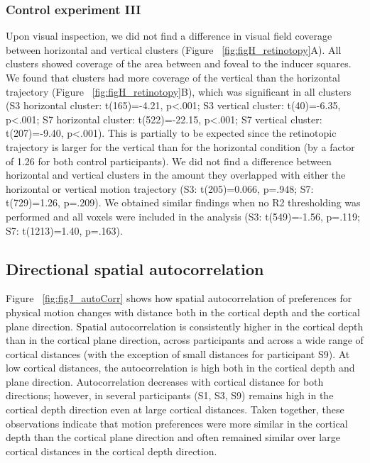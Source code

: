 \subsubsection{Control experiment III}
Upon visual inspection, we did not find a difference in visual field coverage between horizontal and vertical clusters (Figure ~\ref{fig:figH_retinotopy}A). All clusters showed coverage of the area between and foveal to the inducer squares. We found that clusters had more coverage of the vertical than the horizontal trajectory (Figure ~\ref{fig:figH_retinotopy}B), which was significant in all clusters (S3 horizontal cluster: t(165)=-4.21, p\textless.001; S3 vertical cluster: t(40)=-6.35, p\textless.001; S7 horizontal cluster: t(522)=-22.15, p\textless.001; S7 vertical cluster: t(207)=-9.40, p\textless.001). This is partially to be expected since the retinotopic trajectory is larger for the vertical than for the horizontal condition (by a factor of 1.26 for both control participants). We did not find a difference between horizontal and vertical clusters in the amount they overlapped with either the horizontal or vertical motion trajectory (S3: t(205)=0.066, p=.948; S7: t(729)=1.26, p=.209). We obtained similar findings when no R2 thresholding was performed and all voxels were included in the analysis (S3: t(549)=-1.56, p=.119; S7: t(1213)=1.40, p=.163).

\subsection{Directional spatial autocorrelation}
Figure ~\ref{fig:figJ_autoCorr} shows how spatial autocorrelation of preferences for physical motion changes with distance both in the cortical depth and the cortical plane direction. Spatial autocorrelation is consistently higher in the cortical depth than in the cortical plane direction, across participants and across a wide range of cortical distances (with the exception of small distances for participant S9). At low cortical distances, the autocorrelation is high both in the cortical depth and plane direction. Autocorrelation decreases with cortical distance for both directions; however, in several participants (S1, S3, S9) remains high in the cortical depth direction even at large cortical distances. Taken together, these observations indicate that motion preferences were more similar in the cortical depth than the cortical plane direction and often remained similar over large cortical distances in the cortical depth direction.

